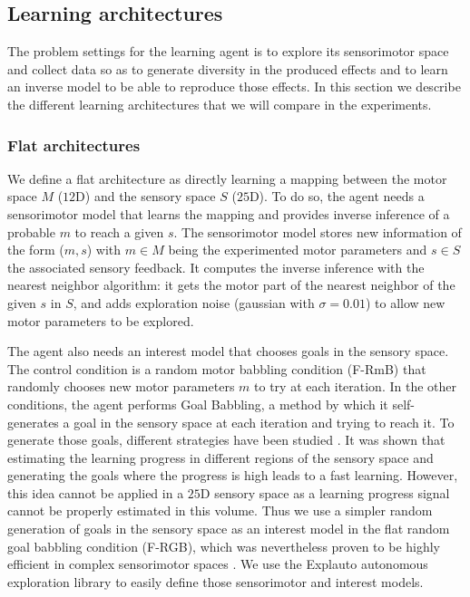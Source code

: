 \documentclass[10pt,letterpaper]{article}
\begin{document}
		
	
	\subsection{Learning architectures}

		The problem settings for the learning agent is to explore its sensorimotor space and collect data so as to generate diversity in the produced effects and to learn an inverse model to 
		be able to reproduce those effects.
		In this section we describe the different learning architectures that we will compare in the experiments.\\
		
		\subsubsection{Flat architectures}
			
			We define a flat architecture as directly learning a mapping between the motor space $M$ ($12$D) and the sensory space $S$ ($25$D).
			To do so, the agent needs a sensorimotor model that learns the mapping and provides inverse inference of a probable $m$ to reach a given $s$.
			The sensorimotor model stores new information of the form ($m, s$) with $m \in M$ being the experimented motor parameters and $s \in S$ the associated sensory feedback. 
			It computes the inverse inference with the nearest neighbor algorithm: 
			it gets the motor part of the nearest neighbor of the given $s$ in $S$, and adds exploration noise (gaussian with $\sigma=0.01$) to allow new motor parameters to be explored.
			
			The agent also needs an interest model that chooses goals in the sensory space.
			The control condition is a random motor babbling condition (F-RmB) that randomly chooses new motor parameters $m$ to try at each iteration.
			In the other conditions, the agent performs Goal Babbling, a method by which it self-generates a goal in the sensory space at each iteration and trying to reach it.
			To generate those goals, different strategies have been studied \cite{baranes_active_2013}. 
			It was shown that estimating the learning progress in different regions of the sensory space and generating the goals where the progress is high leads to a fast learning.
			However, this idea cannot be applied in a $25$D sensory space as a learning progress signal cannot be properly estimated in this volume.
			Thus we use a simpler random generation of goals in the sensory space as an interest model in the flat random goal babbling condition (F-RGB), 
			which was nevertheless proven to be highly efficient in complex sensorimotor spaces \cite{rolf}.
			We use the Explauto autonomous exploration library \cite{moulin-frier_explauto:_2014} to easily define those sensorimotor and interest models.\\
			
\end{document}
